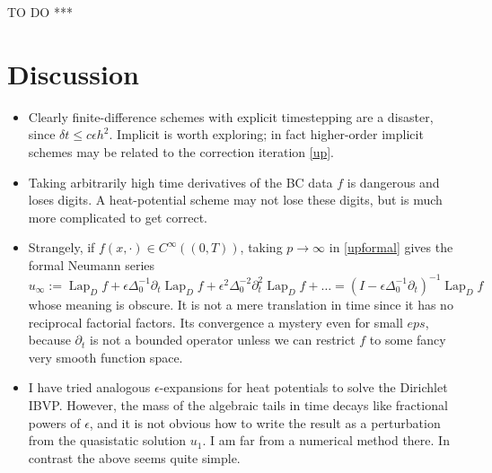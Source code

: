 \documentclass[10pt]{article}
\newcommand{\bi}{\begin{itemize}}
\newcommand{\ei}{\end{itemize}}
\newcommand{\be}{\begin{equation}}
\newcommand{\ee}{\end{equation}}
\newcommand{\eps}{\epsilon}
\newcommand{\dt}{\partial_t}
\DeclareMathOperator{\Lap}{Lap}
\begin{document}
TO DO ***






\section{Discussion}

\bi
\item
  Clearly finite-difference schemes with explicit timestepping are
  a disaster, since $\delta t \le c \eps h^2$.
  Implicit is worth exploring; in fact higher-order
  implicit schemes may be related to the correction iteration \eqref{up}.
\item
  Taking arbitrarily high time derivatives of the BC data $f$ is dangerous
  and loses digits. A heat-potential scheme may not lose these digits,
  but is much more complicated to get correct.
\item
Strangely, if $f(x,\cdot) \in C^\infty((0,T))$,
taking $p\to\infty$ in \eqref{upformal} gives the formal Neumann series
\be
u_\infty := \Lap_D f + \eps \Delta_0^{-1} \dt \Lap_D f + \eps^2 \Delta_0^{-2} \dt^2 \Lap_D f + \dots
= (I - \eps \Delta_0^{-1} \dt)^{-1} \Lap_D f
\ee
whose meaning is obscure.
It is not a mere translation in time since it has no
reciprocal factorial factors. Its convergence a mystery
even for small $eps$, because $\dt$ is not a bounded operator
unless we can restrict $f$ to some fancy very smooth function space.
\item
  I have tried analogous $\eps$-expansions for heat potentials
  to solve the Dirichlet IBVP.
  However, the mass of the algebraic tails in time decays like
  fractional powers of $\eps$, and it is not obvious how to
  write the result as a perturbation from the quasistatic solution $u_1$.
  I am far from a numerical method there. In contrast the above seems
  quite simple.
  \ei




\end{document}
